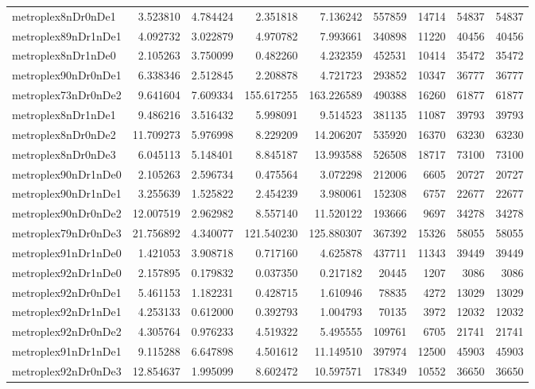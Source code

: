 \begin{longtable}{|l|r|r|r|r|r|r|r|r|}
metroplex8nDr0nDe1 & 3.523810 & 4.784424 & 2.351818 & 7.136242 & 557859 & 14714 & 54837 & 54837 \\
metroplex89nDr1nDe1 & 4.092732 & 3.022879 & 4.970782 & 7.993661 & 340898 & 11220 & 40456 & 40456 \\
metroplex8nDr1nDe0 & 2.105263 & 3.750099 & 0.482260 & 4.232359 & 452531 & 10414 & 35472 & 35472 \\
metroplex90nDr0nDe1 & 6.338346 & 2.512845 & 2.208878 & 4.721723 & 293852 & 10347 & 36777 & 36777 \\
metroplex73nDr0nDe2 & 9.641604 & 7.609334 & 155.617255 & 163.226589 & 490388 & 16260 & 61877 & 61877 \\
metroplex8nDr1nDe1 & 9.486216 & 3.516432 & 5.998091 & 9.514523 & 381135 & 11087 & 39793 & 39793 \\
metroplex8nDr0nDe2 & 11.709273 & 5.976998 & 8.229209 & 14.206207 & 535920 & 16370 & 63230 & 63230 \\
metroplex8nDr0nDe3 & 6.045113 & 5.148401 & 8.845187 & 13.993588 & 526508 & 18717 & 73100 & 73100 \\
metroplex90nDr1nDe0 & 2.105263 & 2.596734 & 0.475564 & 3.072298 & 212006 & 6605 & 20727 & 20727 \\
metroplex90nDr1nDe1 & 3.255639 & 1.525822 & 2.454239 & 3.980061 & 152308 & 6757 & 22677 & 22677 \\
metroplex90nDr0nDe2 & 12.007519 & 2.962982 & 8.557140 & 11.520122 & 193666 & 9697 & 34278 & 34278 \\
metroplex79nDr0nDe3 & 21.756892 & 4.340077 & 121.540230 & 125.880307 & 367392 & 15326 & 58055 & 58055 \\
metroplex91nDr1nDe0 & 1.421053 & 3.908718 & 0.717160 & 4.625878 & 437711 & 11343 & 39449 & 39449 \\
metroplex92nDr1nDe0 & 2.157895 & 0.179832 & 0.037350 & 0.217182 & 20445 & 1207 & 3086 & 3086 \\
metroplex92nDr0nDe1 & 5.461153 & 1.182231 & 0.428715 & 1.610946 & 78835 & 4272 & 13029 & 13029 \\
metroplex92nDr1nDe1 & 4.253133 & 0.612000 & 0.392793 & 1.004793 & 70135 & 3972 & 12032 & 12032 \\
metroplex92nDr0nDe2 & 4.305764 & 0.976233 & 4.519322 & 5.495555 & 109761 & 6705 & 21741 & 21741 \\
metroplex91nDr1nDe1 & 9.115288 & 6.647898 & 4.501612 & 11.149510 & 397974 & 12500 & 45903 & 45903 \\
metroplex92nDr0nDe3 & 12.854637 & 1.995099 & 8.602472 & 10.597571 & 178349 & 10552 & 36650 & 36650 \\

\end{longtable}
